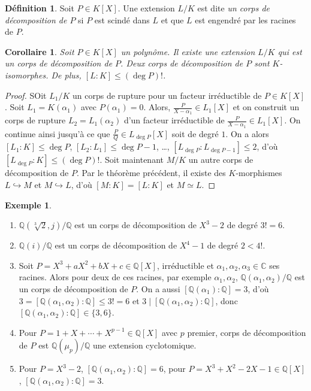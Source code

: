 \documentclass{article}
\newcommand{\Q}{\mathbb{Q}}
\newcommand{\C}{\mathbb{C}}
\theoremstyle{plain}
\newtheorem{corollary}[theorem]{Corollaire}
\theoremstyle{definition}
\newtheorem{definition}[theorem]{Définition}
\newtheorem{example}[theorem]{Exemple}
\theoremstyle{remark}
\begin{document}
\begin{definition}
    Soit $P \in K[X]$. Une extension $L/K$ est dite \emph{un corps de décomposition de $P$} si $P$ est scindé dans $L$ et que $L$ est engendré par les racines de $P$.
\end{definition}

\begin{corollary}
    Soit $P \in K[X]$ un polynôme. Il existe une extension $L/K$ qui est un corps de décomposition de $P$. Deux corps de décomposition de $P$ sont $K$-isomorphes. De plus, $[L : K] \le (\deg P)!$.
\end{corollary}

\begin{proof}
    SOit $L_1/K$ un corps de rupture pour un facteur irréductible de $P \in K[X]$. Soit $L_1 = K(\alpha_1)$ avec $P(\alpha_1) = 0$. Alors, $\frac{P}{X-\alpha_1} \in L_1[X]$ et on construit un corps de rupture $L_2 = L_1(\alpha_2)$ d'un facteur irréductible de $\frac{P}{X-\alpha_1} \in L_1 [X]$. On continue ainsi jusqu'à ce que $\frac{P}{Q} \in L_{\deg P} [X]$ soit de degré $1$. On a alors $[L_1 : K] \le \deg P$, $[L_2 : L_1] \le \deg P - 1$, \dots, $[L_{\deg P} : L_{\deg P - 1}] \le 2$, d'où $[L_{\deg P} : K] \le (\deg P)!$. Soit maintenant $M/K$ un autre corps de décomposition de $P$. Par le théorème précédent, il existe des $K$-morphismes $L \hookrightarrow M$ et $M \hookrightarrow L$, d'où $[M : K] = [L : K]$ et $M \simeq L$.
\end{proof}

\begin{example} \leavevmode
    \begin{enumerate}
        \item $\Q(\sqrt[3]{2},j)/\Q$ est un corps de décomposition de $X^3 - 2$ de degré $3! = 6$.
        \item $\Q(i)/\Q$ est un corps de décomposition de $X^4 - 1$ de degré $2 < 4!$.
        \item Soit $P = X^3 + a X^2 + b X + c \in \Q[X]$, irréductible et $\alpha_1,\alpha_2,\alpha_3 \in \C$ ses racines. Alors pour deux de ces racines, par exemple $\alpha_1,\alpha_2$, $\Q(\alpha_1,\alpha_2)/\Q$ est un corps de décomposition de $P$. On a aussi $[\Q(\alpha_1) : \Q] = 3$, d'où $3 = [\Q(\alpha_1,\alpha_2) : \Q] \le 3! = 6$ et $3 \mid [\Q(\alpha_1,\alpha_2) : \Q]$, donc $[\Q(\alpha_1,\alpha_2) : \Q] \in \{3,6\}$.
        \item Pour $P = 1 + X + \cdots + X^{p-1} \in \Q[X]$ avec $p$ premier, corps de décomposition de $P$ est $\Q(\mu_p)/\Q$ une extension cyclotomique.
        \item Pour $P = X^3 - 2$, $[\Q(\alpha_1, \alpha_2) : \Q] = 6$, pour $P = X^3 + X^2 - 2X - 1 \in \Q[X]$, $[\Q(\alpha_1,\alpha_2) : \Q] = 3$.
    \end{enumerate}
\end{example}
\end{document}
